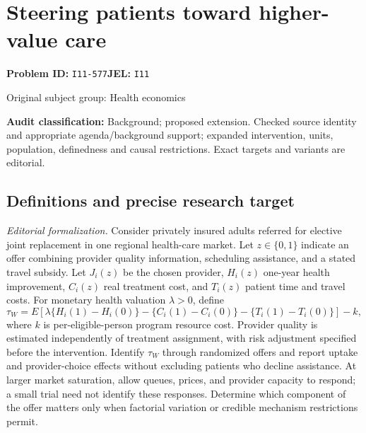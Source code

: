 \documentclass[11pt,a4paper]{article}
\begin{document}
\section*{Steering patients toward higher-value care}
\textbf{Problem ID:} \texttt{I11-577}\quad \textbf{JEL:} \texttt{I11}\par
\label{problem:OP-0444}
{\sffamily\small\color{muted}Original subject group: Health economics\par}
\label{definitions:problem:30007726}
\textbf{Audit classification:} Background; proposed extension. Checked source identity and appropriate agenda/background support; expanded intervention, units, population, definedness and causal restrictions. Exact targets and variants are editorial.
\subsection*{Definitions and precise research target}
\textit{Editorial formalization.} Consider privately insured adults referred for elective joint replacement in one regional health-care market. Let \(z\in\{0,1\}\) indicate an offer combining provider quality information, scheduling assistance, and a stated travel subsidy. Let \(J_i(z)\) be the chosen provider, \(H_i(z)\) one-year health improvement, \(C_i(z)\) real treatment cost, and \(T_i(z)\) patient time and travel costs. For monetary health valuation \(\lambda>0\), define
\[\tau_W=E[\lambda\{H_i(1)-H_i(0)\}-\{C_i(1)-C_i(0)\}-\{T_i(1)-T_i(0)\}]-k,\]
where \(k\) is per-eligible-person program resource cost. Provider quality is estimated independently of treatment assignment, with risk adjustment specified before the intervention. Identify \(\tau_W\) through randomized offers and report uptake and provider-choice effects without excluding patients who decline assistance. At larger market saturation, allow queues, prices, and provider capacity to respond; a small trial need not identify these responses. Determine which component of the offer matters only when factorial variation or credible mechanism restrictions permit.
\end{document}
